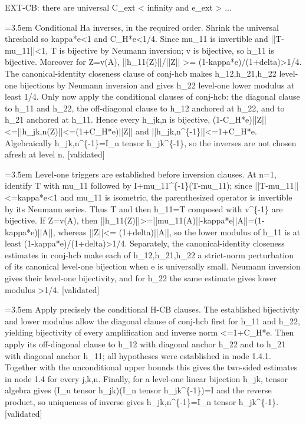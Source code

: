 \documentclass{article}
\newcommand{\step}[1]{\par\noindent\hangindent=3.5em\hangafter=1%
  \makebox[3.5em][l]{\textbf{#1.}}}
\newcommand{\steptag}[1]{\hfill{\small\textsf{[#1]}}}
\begin{document}
\begin{proofbox}{EXT-CB: there are universal C\_ext < infinity and e\_ext > ...}
\step{1.4} Conditional Ha inverses, in the required order. Shrink the universal threshold so kappa*e<1 and C\_H*e<1/4. Since mu\_11 is invertible and ||T-mu\_11||<1, T is bijective by Neumann inversion; v is bijective, so h\_11 is bijective. Moreover for Z=v(A), ||h\_11(Z)||/||Z|| >= (1-kappa*e)/(1+delta)>1/4. The canonical-identity closeness clause of conj-hcb makes h\_12,h\_21,h\_22 level-one bijections by Neumann inversion and gives h\_22 level-one lower modulus at least 1/4. Only now apply the conditional clauses of conj-hcb: the diagonal clause to h\_11 and h\_22, the off-diagonal clause to h\_12 anchored at h\_22, and to h\_21 anchored at h\_11. Hence every h\_jk,n is bijective, (1-C\_H*e)||Z||<=||h\_jk,n(Z)||<=(1+C\_H*e)||Z|| and ||h\_jk,n\textasciicircum{}\{-1\}||<=1+C\_H*e. Algebraically h\_jk,n\textasciicircum{}\{-1\}=I\_n tensor h\_jk\textasciicircum{}\{-1\}, so the inverses are not chosen afresh at level n. \steptag{validated} \\[6pt]
\step{1.4.1} Level-one triggers are established before inversion clauses. At n=1, identify T with mu\_11 followed by I+mu\_11\textasciicircum{}\{-1\}(T-mu\_11); since ||T-mu\_11||<=kappa*e<1 and mu\_11 is isometric, the parenthesized operator is invertible by its Neumann series. Thus T and then h\_11=T composed with v\textasciicircum{}\{-1\} are bijective. If Z=v(A), then ||h\_11(Z)||>=||mu\_11(A)||-kappa*e||A||=(1-kappa*e)||A||, whereas ||Z||<= (1+delta)||A||, so the lower modulus of h\_11 is at least (1-kappa*e)/(1+delta)>1/4. Separately, the canonical-identity closeness estimates in conj-hcb make each of h\_12,h\_21,h\_22 a strict-norm perturbation of its canonical level-one bijection when e is universally small. Neumann inversion gives their level-one bijectivity, and for h\_22 the same estimate gives lower modulus >1/4. \steptag{validated} \\[4pt]
\step{1.4.2} Apply precisely the conditional H-CB clauses. The established bijectivity and lower modulus allow the diagonal clause of conj-hcb first for h\_11 and h\_22, yielding bijectivity of every amplification and inverse norm <=1+C\_H*e. Then apply its off-diagonal clause to h\_12 with diagonal anchor h\_22 and to h\_21 with diagonal anchor h\_11; all hypotheses were established in node 1.4.1. Together with the unconditional upper bounds this gives the two-sided estimates in node 1.4 for every j,k,n. Finally, for a level-one linear bijection h\_jk, tensor algebra gives (I\_n tensor h\_jk)(I\_n tensor h\_jk\textasciicircum{}\{-1\})=I and the reverse product, so uniqueness of inverse gives h\_jk,n\textasciicircum{}\{-1\}=I\_n tensor h\_jk\textasciicircum{}\{-1\}. \steptag{validated} \\[4pt]

\end{proofbox}
\end{document}
